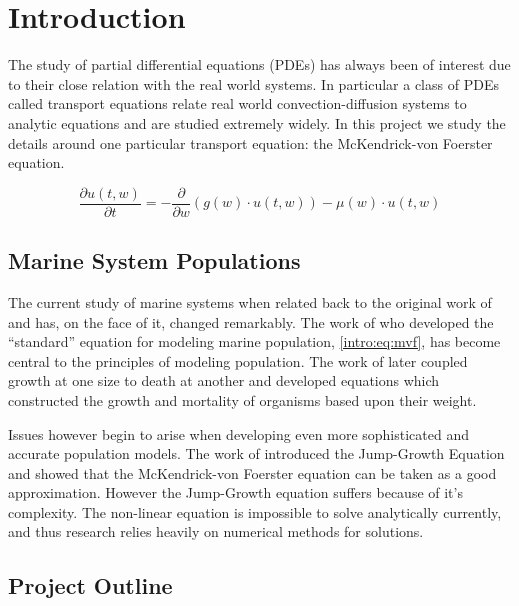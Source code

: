 \documentclass[../main]{subfiles}
\makeatletter
\renewenvironment{abstract}{%
  \if@twocolumn
    \section*{\abstractname}%
  \else
    \small
    \begin{center}%
      {\bfseries \abstractname\vspace{-.5em}\vspace{\z@}}%
    \end{center}%
    \quotation
  \fi}
  {\if@twocolumn\else\endquotation\fi}
\makeatother
\begin{document}
  \setlength{\parskip}{0.75em}

  \chapter{Introduction}\label{chapter:introduction}
  The study of partial differential equations (PDEs) has always been of interest due to their close relation with the real world systems. In particular a class of PDEs called transport equations relate real world convection-diffusion systems to analytic equations and are studied extremely widely. In this project we study the details around one particular transport equation: the McKendrick-von Foerster equation.

  \begin{equation} \label{intro:eq:mvf}
    \frac{\partial u(t, w)}{\partial t} = - \frac{\partial}{\partial w} \left(g(w) \cdot u(t, w) \right) - \mu(w) \cdot u(t, w)
  \end{equation}

  \section{Marine System Populations}
  The current study of marine systems when related back to the original work of \cite{mckendrick1926} and \cite{foerster1959} has, on the face of it, changed remarkably. The work of \cite{silvert1978} who developed the ``standard'' equation for modeling marine population, \autoref{intro:eq:mvf}, has become central to the principles of modeling population. The work of \cite{silvert1980} later coupled growth at one size to death at another and developed equations which constructed the growth and mortality of organisms based upon their weight.

  Issues however begin to arise when developing even more sophisticated and accurate population models. The work of \cite{datta2010} introduced the Jump-Growth Equation and showed that the McKendrick-von Foerster equation can be taken as a good approximation. However the Jump-Growth equation suffers because of it's complexity. The non-linear equation is impossible to solve analytically currently, and thus research relies heavily on numerical methods for solutions.

  \section{Project Outline}
\end{document}
